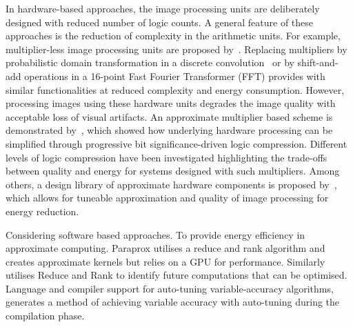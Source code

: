 \documentclass[journal]{IEEEtran}
\begin{document}

In hardware-based approaches, the image processing units are deliberately designed with reduced number of logic counts. A general feature of these approaches is the reduction of complexity in the arithmetic units. For example, multiplier-less image processing units are proposed by~\cite{alawad2014energy,prasanthi2005multiplier}. Replacing multipliers by probabilistic domain transformation in a discrete convolution~\cite{alawad2014energy} or by shift-and-add operations in a 16-point Fast Fourier Transformer (FFT) provides with similar functionalities at reduced complexity and energy consumption. However, processing images using these hardware units degrades the image quality with acceptable loss of visual artifacts. An approximate multiplier based scheme is demonstrated by~\cite{Issa2017}, which showed how underlying hardware processing can be simplified through progressive bit significance-driven logic compression. Different levels of logic compression have been investigated highlighting the trade-offs between quality and energy for systems designed with such multipliers. Among others, a design library of approximate hardware components is proposed by~\cite{Lucas2017}, which allows for tuneable approximation and quality of image processing for energy reduction.

Considering software based approaches. To provide energy efficiency in approximate computing. Paraprox \cite{Samadi2014} utilises  a reduce and rank algorithm and creates approximate kernels but relies on a GPU for performance.
Similarly \cite{Raha2015} utilises Reduce and Rank to identify future computations that can be optimised.
Language and compiler support for auto-tuning variable-accuracy
algorithms,~\cite{Ansel2011} generates a method of achieving variable accuracy with auto-tuning during the compilation phase.
\end{document}
